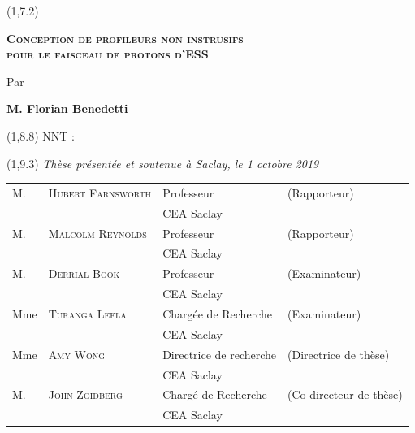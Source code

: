 \begin{textblock}{14}(1,7.2)
	\begin{center}	
		\Large \textsc{\textcolor{SchoolColor}{
				\textbf{Conception de profileurs non instrusifs \\pour le faisceau de protons d’ESS}}}\par
		Par\par  \large \textbf{M. Florian Benedetti} \par
	\end{center}
\end{textblock}


\begin{textblock}{13}(1,8.8)
	NNT : 
\end{textblock}

\begin{textblock}{14}(1,9.3)
	\vspace{1.5cm}
	\hspace{1cm}\textit{Thèse présentée et soutenue à Saclay, le 1 octobre 2019}
	\begin{center}
		\begin{tabular}{llll}
			M.    & \textsc{Hubert Farnsworth} & Professeur              & (Rapporteur)            \\
			\null & \null                      & CEA Saclay              &                         \\   
			
			M.    & \textsc{Malcolm Reynolds}  & Professeur              & (Rapporteur)            \\
			\null & \null                      & CEA Saclay              &                         \\ 
			
			M.    & \textsc{Derrial Book}      & Professeur              & (Examinateur)           \\
			\null & \null                      & CEA Saclay              &                         \\ 
			
			Mme   & \textsc{Turanga Leela}     & Chargée de Recherche    & (Examinateur)           \\
			\null & \null                      & CEA Saclay              &                         \\ 
			
			Mme   & \textsc{Amy Wong}          & Directrice de recherche & (Directrice de thèse)   \\
			\null & \null                      & CEA Saclay              &                         \\ 
			
			M.    & \textsc{John Zoidberg}     & Chargé de Recherche     & (Co-directeur de thèse) \\
			\null & \null                      & CEA Saclay              &                         \\ 		
		\end{tabular}
	\end{center}
\end{textblock}





